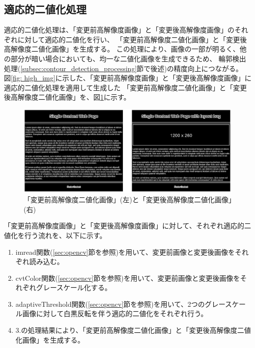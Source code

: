 \subsection{適応的二値化処理}\label{subsec:Adaptive_Binarisation}
適応的二値化処理は、「変更前高解像度画像」と「変更後高解像度画像」のそれぞれに対して適応的二値化を行い、
「変更前高解像度二値化画像」と「変更後高解像度二値化画像」を生成する。
この処理により、画像の一部が明るく、他の部分が暗い場合においても、均一な二値化画像を生成できるため、
輪郭検出処理(\ref{subsec:contour_detection_processing}節で後述)の精度向上につながる。
図\ref{fig: high_img}に示した、「変更前高解像度画像」と「変更後高解像度画像」に適応的二値化処理を適用して生成した
「変更前高解像度二値化画像」と「変更後高解像度二値化画像」を、図\ref{fig: img_high_bin_bf_af}に示す。
\begin{figure}[tp]
    \begin{center}
        \includegraphics[width=1.0\columnwidth]{image/4_img_high_bin_bf_af.png}
        \caption{「変更前高解像度二値化画像」(左)と「変更後高解像度二値化画像」(右)}
        \label{fig: img_high_bin_bf_af}
    \end{center}
\end{figure}
\par
「変更前高解像度画像」と「変更後高解像度画像」に対して、それぞれ適応的二値化を行う流れを、以下に示す。
\begin{enumerate}
    \item imread関数(\ref{sec:opencv}節を参照)を用いて、変更前画像と変更後画像をそれぞれ読み込む。
    \item cvtColor関数(\ref{sec:opencv}節を参照)を用いて、変更前画像と変更後画像をそれぞれグレースケール化する。
    \item adaptiveThreshold関数(\ref{sec:opencv}節を参照)を用いて、2つのグレースケール画像に対して白黒反転を伴う適応的二値化をそれぞれ行う。
    \item 3.の処理結果により、「変更前高解像度二値化画像」と「変更後高解像度二値化画像」を生成する。
\end{enumerate}

